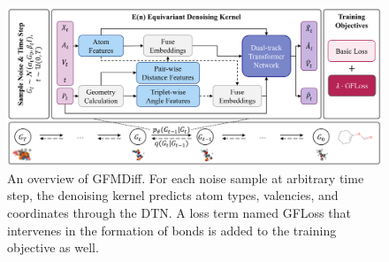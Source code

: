 \documentclass[letterpaper]{article} %
\begin{document}

\begin{figure}[t]
    \centering
    \includegraphics[width=0.8\linewidth]{overview_gfmdiff.png}
    \caption{An overview of GFMDiff. For each noise sample at arbitrary time step, the denoising kernel predicts atom types, valencies, and coordinates through the DTN. A loss term named GFLoss that intervenes in the formation of bonds is added to the training objective as well.}
    \label{fig:gfmdiff}
  \end{figure}
\end{document}
